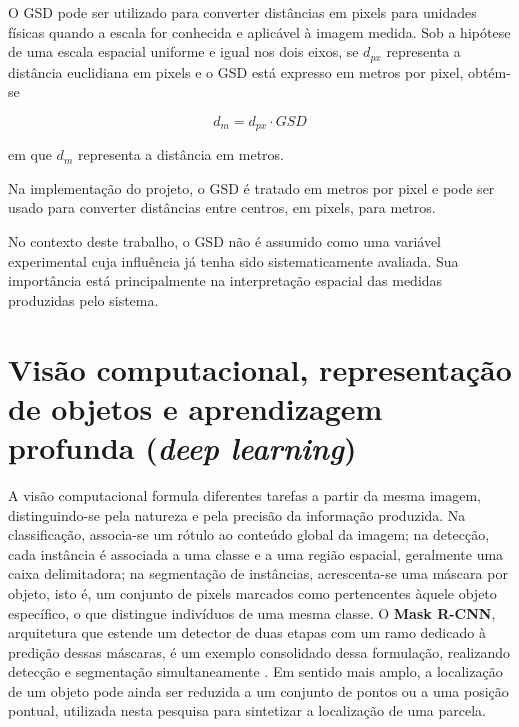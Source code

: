 O GSD pode ser utilizado para converter dist\^ancias em pixels para unidades f\'isicas quando a escala for conhecida e aplic\'avel \`a imagem medida. Sob a hip\'otese de uma escala espacial uniforme e igual nos dois eixos, se $d_{px}$ representa a dist\^ancia euclidiana em pixels e o GSD est\'a expresso em metros por pixel, obt\'em-se

\begin{equation}
  d_m = d_{px} \cdot \mathit{GSD}
  \label{eq:gsd}
\end{equation}

em que $d_m$ representa a dist\^ancia em metros.

Na implementa\c{c}\~ao do projeto, o GSD \'e tratado em metros por pixel e pode ser usado para converter dist\^ancias entre centros, em pixels, para metros.

No contexto deste trabalho, o GSD n\~ao \'e assumido como uma vari\'avel experimental cuja influ\^encia j\'a tenha sido sistematicamente avaliada. Sua import\^ancia est\'a principalmente na interpreta\c{c}\~ao espacial das medidas produzidas pelo sistema.

\section{Vis\~ao computacional, representa\c{c}\~ao de objetos e aprendizagem profunda (\textit{deep learning})}
\label{sec:visao-computacional}

A vis\~ao computacional formula diferentes tarefas a partir da mesma imagem, distinguindo-se pela natureza e pela precis\~ao da informa\c{c}\~ao produzida. Na classifica\c{c}\~ao, associa-se um r\'otulo ao conte\'udo global da imagem; na detec\c{c}\~ao, cada inst\^ancia \'e associada a uma classe e a uma regi\~ao espacial, geralmente uma caixa delimitadora; na segmenta\c{c}\~ao de inst\^ancias, acrescenta-se uma m\'ascara por objeto, isto \'e, um conjunto de pixels marcados como pertencentes \`aquele objeto espec\'ifico, o que distingue indiv\'iduos de uma mesma classe. O \textbf{Mask R-CNN}, arquitetura que estende um detector de duas etapas com um ramo dedicado \`a predi\c{c}\~ao dessas m\'ascaras, \'e um exemplo consolidado dessa formula\c{c}\~ao, realizando detec\c{c}\~ao e segmenta\c{c}\~ao simultaneamente \citep{he2017}. Em sentido mais amplo, a localiza\c{c}\~ao de um objeto pode ainda ser reduzida a um conjunto de pontos ou a uma posi\c{c}\~ao pontual, utilizada nesta pesquisa para sintetizar a localiza\c{c}\~ao de uma parcela.


